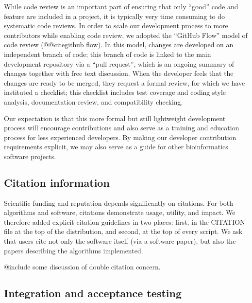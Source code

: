 \documentclass[11pt]{article}
\begin{document}
While code review is an important part of ensuring that only ``good''
code and feature are included in a project, it is typically very time
consuming to do systematic code reviews.  In order to scale our
development process to more contributors while enabling code review,
we adopted the ``GitHub Flow'' model of code review (@@citegithub
flow).  In this model, changes are developed on an independent branch
of code; this branch of code is linked to the main development
repository via a ``pull request'', which is an ongoing summary of
changes together with free text discussion.  When the developer feels
that the changes are ready to be merged, they request a formal review,
for which we have instituted a checklist; this checklist includes test
coverage and coding style analysis, documentation review, and
compatibility checking.

Our expectation is that this more formal but still lightweight
development process will encourage contributions and also serve as a
training and education process for less experienced developers.  By
making our developer contribution requirements explicit, we may also
serve as a guide for other bioinformatics software projects.



\subsection{Citation information}

Scientific funding and reputation depends significantly on citations.
For both algorithms and software, citations demonstrate usage,
utility, and impact.  We therefore added explicit citation guidelines
in two places: first, in the CITATION file at the top of the
distribution, and second, at the top of every script.  We ask that
users cite not only the software itself (via a software paper), but
also the papers describing the algorithms implemented.

@include some discussion of double citation concern.

\subsection{Integration and acceptance testing}
\end{document}
